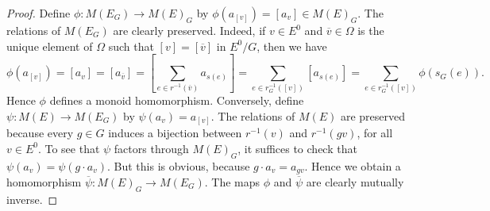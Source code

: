 \documentclass[10pt,a4paper]{amsart}
\def\ol{\overline}
\begin{document}
\begin{proof}  
	Define $\phi\colon M(E_G)\to M(E)_G$ by $\phi (a_{[v]}) = [a_v]\in M(E)_G$. The relations of $M(E_G)$ are clearly preserved. Indeed, if $v\in E^0$ and $\ol{v}\in \Omega$ is the unique element of $\Omega$ such that $[v]=[\ol{v}]$ in $E^0/G$, then we have
	$$\phi (a_{[v]}) = [a_v] = [a_{\ol{v}}] = [\sum _{e\in r^{-1}(\ol{v})} a_{s(e)}] = \sum_{e\in r_G^{-1}([v])} [a_{s(e)}] = \sum _{e\in r_G^{-1}([v])} \phi (s_G (e)).$$
	Hence $\phi$ defines a monoid homomorphism. Conversely, define $\psi \colon M(E)\to M(E_G)$
	by $\psi (a_v)= a_{[v]}$. The relations of $M(E)$ are preserved because every  $g\in G$ induces a bijection between $r^{-1}(v)$ and $r^{-1}(gv)$, for all $v\in E^0$. To see that $\psi$ factors through $M(E)_G$, it suffices to check that $\psi (a_v) = \psi (g\cdot a_v)$. But this is obvious, because $g\cdot a_v = a_{gv}$. 
    Hence we obtain a homomorphism $\ol{\psi}\colon M(E)_G\to M(E_G)$. 
    The maps $\phi$ and $\ol{\psi}$ are clearly mutually inverse.   
\end{proof}
\end{document}
